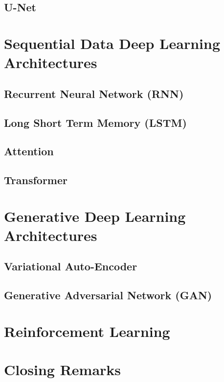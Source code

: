 \documentclass[10pt]{article}
\begin{document}
\subsection{U-Net}

\section{Sequential Data Deep Learning Architectures}

\subsection{Recurrent Neural Network (RNN)}

\subsection{Long Short Term Memory (LSTM)}

\subsection{Attention}

\subsection{Transformer}

\section{Generative Deep Learning Architectures}

\subsection{Variational Auto-Encoder}

\subsection{Generative Adversarial Network (GAN)}

\section{Reinforcement Learning}

\section{Closing Remarks}
\end{document}
